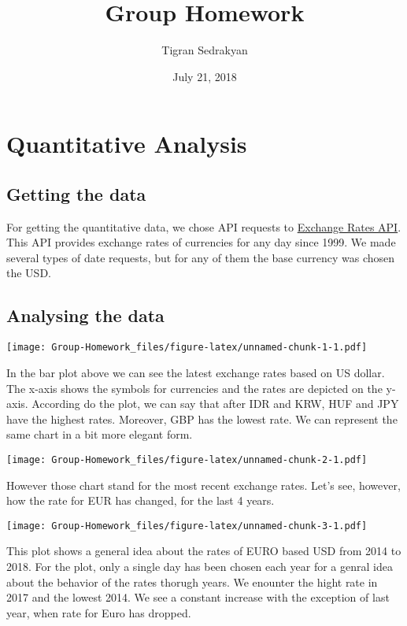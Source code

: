 \documentclass[]{article}
\title{Group Homework}
\author{Tigran Sedrakyan}
\date{July 21, 2018}
\begin{document}
\maketitle

\section{Quantitative Analysis}\label{quantitative-analysis}

\subsection{Getting the data}\label{getting-the-data}

For getting the quantitative data, we chose API requests to
\href{https://exchangeratesapi.io/}{Exchange Rates API}. This API
provides exchange rates of currencies for any day since 1999. We made
several types of date requests, but for any of them the base currency
was chosen the USD.

\subsection{Analysing the data}\label{analysing-the-data}

\texttt{[image: Group-Homework\_files/figure-latex/unnamed-chunk-1-1.pdf]}

In the bar plot above we can see the latest exchange rates based on US
dollar. The x-axis shows the symbols for currencies and the rates are
depicted on the y-axis. According do the plot, we can say that after IDR
and KRW, HUF and JPY have the highest rates. Moreover, GBP has the
lowest rate. We can represent the same chart in a bit more elegant form.

\texttt{[image: Group-Homework\_files/figure-latex/unnamed-chunk-2-1.pdf]}

However those chart stand for the most recent exchange rates. Let's see,
however, how the rate for EUR has changed, for the last 4 years.

\texttt{[image: Group-Homework\_files/figure-latex/unnamed-chunk-3-1.pdf]}

This plot shows a general idea about the rates of EURO based USD from
2014 to 2018. For the plot, only a single day has been chosen each year
for a genral idea about the behavior of the rates thorugh years. We
enounter the hight rate in 2017 and the lowest 2014. We see a constant
increase with the exception of last year, when rate for Euro has
dropped.
\end{document}
